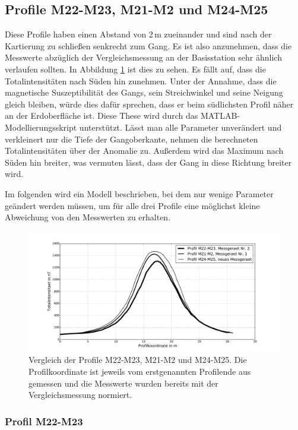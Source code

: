 \subsection{Profile M22-M23, M21-M2 und M24-M25}

Diese Profile haben einen Abstand von 2\,m zueinander und sind nach der Kartierung zu schließen senkrecht zum Gang. Es ist also anzunehmen, dass die Messwerte abzüglich der Vergleichsmessung an der Basisstation sehr ähnlich verlaufen sollten. In Abbildung \ref{fig:Vergleich_Profile} ist dies zu sehen. Es fällt auf, dass die Totalintensitäten nach Süden hin zunehmen. Unter der Annahme, dass die magnetische Suszeptibilität des Gangs, sein Streichwinkel und seine Neigung gleich bleiben, würde dies dafür sprechen, dass er beim südlichsten Profil näher an der Erdoberfläche ist. Diese These wird durch das MATLAB-Modellierungsskript unterstützt. Lässt man alle Parameter unverändert und verkleinert nur die Tiefe der Gangoberkante, nehmen die berechneten Totalintensitäten über der Anomalie zu. Außerdem wird das Maximum nach Süden hin breiter, was vermuten lässt, dass der Gang in diese Richtung breiter wird.

Im folgenden wird ein Modell beschrieben, bei dem nur wenige Parameter geändert werden müssen, um für alle drei Profile eine möglichst kleine Abweichung von den Messwerten zu erhalten.

\begin{figure}
 \centering
 \includegraphics[width=\textwidth]{fig/Vergleich_nahe_Profile.pdf}
 \caption[Vergleich der Profile M22-M23, M21-M2 und M24-M25]{Vergleich der Profile M22-M23, M21-M2 und M24-M25. Die Profilkoordinate ist jeweils vom erstgenannten Profilende aus gemessen und die Messwerte wurden bereits mit der Vergleichsmessung normiert.}
 \label{fig:Vergleich_Profile}
\end{figure}

\subsubsection{Profil M22-M23}

